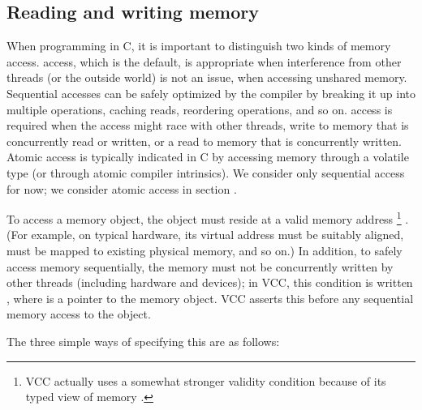 \subsection{Reading and writing memory}
\label{sect:writes}

When programming in C, it is important to distinguish two kinds of
memory access.  access, which is the default, is appropriate when
interference from other threads (or the outside world) is not an
issue, \eg when accessing unshared memory. Sequential accesses can be
safely optimized by the compiler by breaking it up into multiple
operations, caching reads, reordering operations, and so on. 
 access is required when the access might race with other
threads, \ie write to memory that is concurrently read or written,
or a read to memory that is concurrently written. Atomic access is typically
indicated in C by accessing memory through a volatile type (or through atomic 
compiler intrinsics). We consider only sequential 
access for now; we consider atomic access in section .

To access a memory object, the object must reside at a valid memory address%
\footnote{VCC actually uses a somewhat stronger validity condition because of 
its typed view of memory .
}%
. (For example, on typical hardware, its virtual address must be suitably aligned,
must be mapped to existing physical memory, and so on.) 
In addition, to safely access memory sequentially, the memory must not be concurrently
written by other threads (including hardware and devices); in VCC, this condition is written
, where  is a pointer to the memory object. VCC asserts this 
before any sequential memory access to the object. 



The three simple ways of specifying this are as follows:

